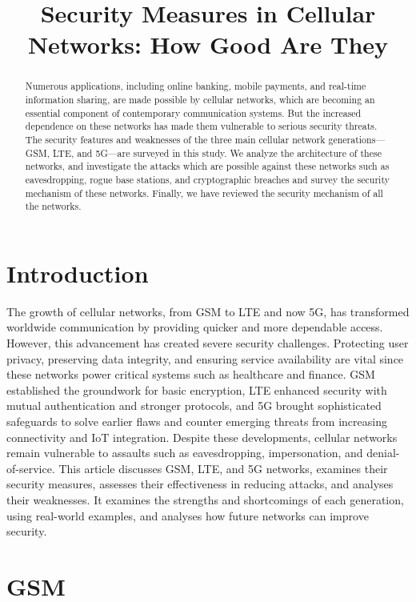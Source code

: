 \documentclass[conference]{IEEEtran}
\title{Security Measures in Cellular Networks: How Good Are They}
\author{}
\begin{document}
\maketitle

\begin{abstract}
 Numerous applications, including online banking, mobile payments, and real-time information sharing, are made possible by cellular networks, which are becoming an essential component of contemporary communication systems. But the increased dependence on these networks has made them vulnerable to serious security threats. The security features and weaknesses of the three main cellular network generations—GSM, LTE, and 5G—are surveyed in this study. We analyze the architecture of these networks, and investigate the attacks which are possible against these networks such as eavesdropping, rogue base stations, and cryptographic breaches and survey the security mechanism of these networks. Finally, we have reviewed the security mechanism of all the networks.

\end{abstract}

\section{Introduction}
The growth of cellular networks, from GSM to LTE and now 5G, has transformed worldwide communication by providing quicker and more dependable access. However, this advancement has created severe security challenges. Protecting user privacy, preserving data integrity, and ensuring service availability are vital since these networks power critical systems such as healthcare and finance.
GSM established the groundwork for basic encryption, LTE enhanced security with mutual authentication and stronger protocols, and 5G brought sophisticated safeguards to solve earlier flaws and counter emerging threats from increasing connectivity and IoT integration. Despite these developments, cellular networks remain vulnerable to assaults such as eavesdropping, impersonation, and denial-of-service.
This article discusses GSM, LTE, and 5G networks, examines their security measures, assesses their effectiveness in reducing attacks, and analyses their weaknesses. It examines the strengths and shortcomings of each generation, using real-world examples, and analyses how future networks can improve security.
 

\section{GSM}
\end{document}
